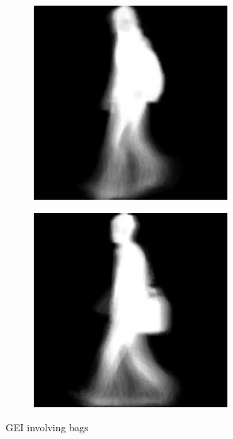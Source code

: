 \documentclass[12pt,a4paper]{article}
\begin{document}
\begin{figure}[!h]
    \centering
    \begin{subfigure}{0.45\textwidth}
        \centering
        \includegraphics[width=0.8\textwidth]{walk-bg1.jpg}
        
        \label{fig:img1}
    \end{subfigure}
    \begin{subfigure}{0.45\textwidth}
        \centering
        \includegraphics[width=0.8\textwidth]{walk-bg2.jpg}
        
        \label{fig:img2}
    \end{subfigure}
    \caption{GEI involving bags}
\end{figure}
\end{document}
